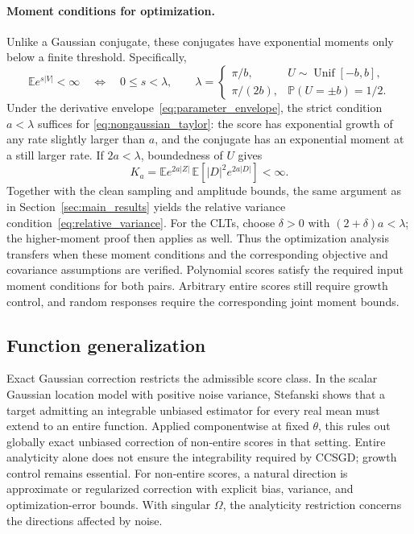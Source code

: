 \paragraph{Moment conditions for optimization.}
Unlike a Gaussian conjugate, these conjugates have exponential moments
only below a finite threshold. Specifically,
\[
\mathbb E e^{s|V|}<\infty\quad\Longleftrightarrow\quad 0\le s<\lambda,
\qquad
\lambda=
\begin{cases}
\pi/b, & U\sim\operatorname{Unif}[-b,b],\\
\pi/(2b), & \mathbb P(U=\pm b)=1/2.
\end{cases}
\]
Under the derivative envelope~\eqref{eq:parameter_envelope}, the strict
condition $a<\lambda$ suffices for
\eqref{eq:nongaussian_taylor}: the score has exponential growth of any
rate slightly larger than $a$, and the conjugate has an exponential
moment at a still larger rate. If $2a<\lambda$, boundedness of $U$ gives
\[
K_a=\mathbb E e^{2a|Z|}\,
\mathbb E[|D|^2e^{2a|D|}]<\infty.
\]
Together with the clean sampling and amplitude bounds, the same argument
as in Section~\ref{sec:main_results} yields the relative variance
condition~\eqref{eq:relative_variance}. For the CLTs, choose $\delta>0$
with $(2+\delta)a<\lambda$; the higher-moment proof then applies as well.
Thus the optimization analysis transfers when these moment conditions
and the corresponding objective and covariance assumptions are verified.
Polynomial scores satisfy the required input moment conditions for both
pairs. Arbitrary entire scores still require growth control, and random
responses require the corresponding joint moment bounds.

\subsection{Function generalization}
Exact Gaussian correction restricts the admissible score class. In the scalar Gaussian location model with positive noise
variance, Stefanski \cite{stefanski1989} shows that a target admitting an
integrable unbiased estimator for every real mean must extend to an entire
function. Applied componentwise at fixed $\theta$, this rules out globally
exact unbiased correction of non-entire scores in that setting.
Entire analyticity alone does not ensure the integrability required by
CCSGD; growth control remains essential. For non-entire scores, a natural
direction is approximate or regularized correction with explicit bias,
variance, and optimization-error bounds. With singular $\Omega$, the
analyticity restriction concerns the directions affected by noise.
